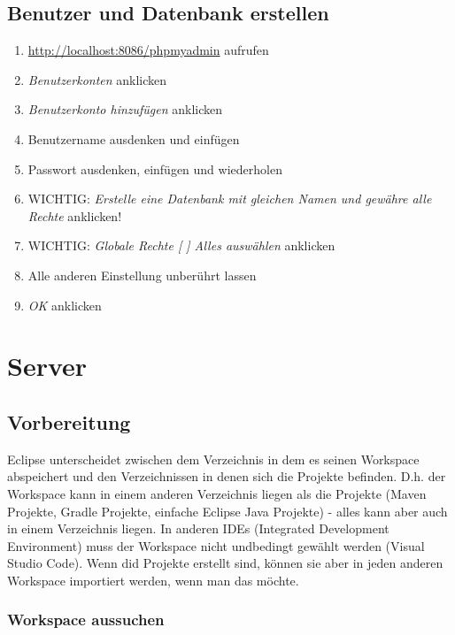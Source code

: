 \documentclass[11pt]{scrartcl}
\begin{document}
\newpage
\subsection{Benutzer und Datenbank erstellen}
\label{sec:benutzerstellen}

\begin{enumerate}
    \item \url{http://localhost:8086/phpmyadmin} aufrufen
    \item \textit{Benutzerkonten} anklicken
    \item \textit{Benutzerkonto hinzufügen} anklicken
    \item Benutzername ausdenken und einfügen
    \item Passwort ausdenken, einfügen und wiederholen
    \item WICHTIG: \textit{Erstelle eine Datenbank mit gleichen Namen und gewähre alle Rechte} anklicken!
    \item WICHTIG: \textit{Globale Rechte [ ] Alles auswählen} anklicken
    \item Alle anderen Einstellung unberührt lassen
    \item \textit{OK} anklicken
\end{enumerate}

\newpage
\section{Server}
\label{sec:server}

\subsection{Vorbereitung}
\label{sec:vorbereitung}

Eclipse unterscheidet zwischen dem Verzeichnis in dem es seinen Workspace
abspeichert und den Verzeichnissen in denen sich die Projekte befinden.
D.h. der Workspace kann in einem anderen Verzeichnis liegen als die Projekte
(Maven Projekte, Gradle Projekte, einfache Eclipse Java Projekte) -
alles kann aber auch in einem Verzeichnis liegen. In anderen IDEs
(Integrated Development Environment) muss der Workspace nicht undbedingt gewählt werden
 (Visual Studio Code). Wenn did Projekte erstellt sind, können sie aber in jeden 
 anderen Workspace importiert werden, wenn man das möchte.

\subsubsection{Workspace aussuchen}
\label{sec:workspaceaussuchen}
\end{document}
